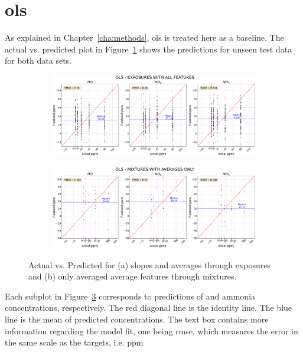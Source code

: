 \section{\acrlong{ols}}
\label{sec:results-ols}

As explained in Chapter~\ref{cha:methods}, \acrshort{ols} is treated here as a baseline. The actual vs. predicted plot in Figure~\ref{fig:ols-exposures} shows the predictions for unseen test data for both data sets.

\begin{figure}[!htb]
	\centering
	
	\begin{subfigure}[b]{1\textwidth}
		\includegraphics[width=1\linewidth]{../figures/ols-act-vs-pred.png}
		\caption{}
		\label{fig:ols-exposures} 
	\end{subfigure}
	
	\begin{subfigure}[b]{1\textwidth}
		\includegraphics[width=1\linewidth]{../figures/ols-avg-act-vs-pred.png}
		\caption{}
		\label{fig:ols-averaged}
	\end{subfigure}
	
	\caption{Actual vs. Predicted for (a) slopes and averages through exposures and (b) only averaged average features through mixtures.}
	\label{fig:ols-both}
\end{figure}

Each subplot  in Figure~\ref{fig:ols-both} corresponds to predictions of \nox and ammonia concentrations, respectively. The red diagonal line is the  identity line. The blue line is the mean of predicted concentrations. The text box contains more information regarding the model fit, one being \acrshort{rmse}, which measures the error in the same scale as the targets, i.e. \acrshort{ppm} 

